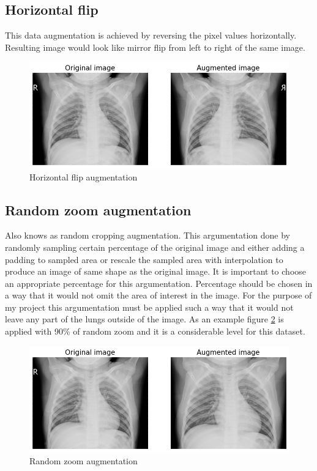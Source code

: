 \subsection{Horizontal flip}
This data augmentation is achieved by reversing the pixel values horizontally.
Resulting image would look like mirror flip from left to right of the same image.

\begin{figure}[H]
    \centering
    \includegraphics[width=\textwidth]{img/augmented-image-1588951788.png}
    \caption{Horizontal flip augmentation}
    \label{fig:horizontalflipxray}
  \end{figure}

\subsection{Random zoom augmentation}
Also knows as random cropping augmentation.
This argumentation done by randomly sampling certain percentage of the original image and either adding a padding to sampled area or rescale the sampled area with interpolation to produce an image of same shape as the original image.
It is important to choose an appropriate percentage for this argumentation.
Percentage should be chosen in a way that it would not omit the area of interest in the image.
For the purpose of my project this argumentation must be applied such a way that it would not leave any part of the lungs outside of the image. 
As an example figure \ref{fig:randomzoomxray} is applied with 90\% of random zoom and it is a considerable level for this dataset.

\begin{figure}[H]
    \centering
    \includegraphics[width=\textwidth]{img/augmented-image-1588951794.png}
    \caption{Random zoom augmentation}
    \label{fig:randomzoomxray}
  \end{figure}

